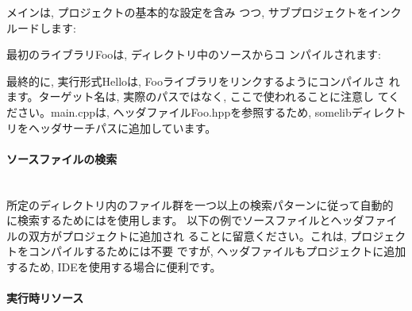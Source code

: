 \documentclass[uplatex,11pt,a4paper,landscape,dvipdfmx]{jsarticle} %
\newcommand{\sectiontitle}[1]{\paragraph{#1} \ \\} %
\begin{document}
\begin{multicols}{2}
\vspace{\baselineskip} %

メインは, プロジェクトの基本的な設定を含み
つつ, サブプロジェクトをインクルードします:


最初のライブラリFooは,  ディレクトリ中のソースからコ
ンパイルされます:




最終的に, 実行形式Helloは, Fooライブラリをリンクするようにコンパイルさ
れます。ターゲット名は, 実際のパスではなく, ここで使われることに注意し
てください。main.cppは, ヘッダファイルFoo.hppを参照するため, somelibディレクト
リをヘッダサーチパスに追加しています。 



\sectiontitle{ソースファイルの検索}


所定のディレクトリ内のファイル群を一つ以上の検索パターンに従って自動的
に検索するためにはを使用します。
以下の例でソースファイルとヘッダファイルの双方がプロジェクトに追加され
ることに留意ください。これは, プロジェクトをコンパイルするためには不要
ですが, ヘッダファイルもプロジェクトに追加するため, IDEを使用する場合に便利です。



\sectiontitle{実行時リソース}


\end{multicols}
\end{document}

